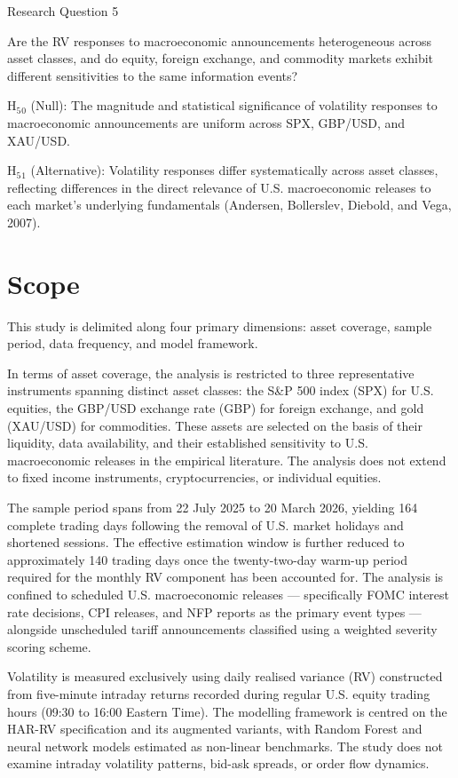 \documentclass[12pt,a4paper]{report}
\begin{document}
Research Question 5

Are the RV responses to macroeconomic announcements heterogeneous across asset classes, and do equity, foreign exchange, and commodity markets exhibit different sensitivities to the same information events?

H$_{5}$$_{0}$ (Null): The magnitude and statistical significance of volatility responses to macroeconomic announcements are uniform across SPX, GBP/USD, and XAU/USD.

H$_{5}$$_{1}$ (Alternative): Volatility responses differ systematically across asset classes, reflecting differences in the direct relevance of U.S. macroeconomic releases to each market's underlying fundamentals (Andersen, Bollerslev, Diebold, and Vega, 2007).

\section{Scope}
This study is delimited along four primary dimensions: asset coverage, sample period, data frequency, and model framework.

In terms of asset coverage, the analysis is restricted to three representative instruments spanning distinct asset classes: the S\&P 500 index (SPX) for U.S. equities, the GBP/USD exchange rate (GBP) for foreign exchange, and gold (XAU/USD) for commodities. These assets are selected on the basis of their liquidity, data availability, and their established sensitivity to U.S. macroeconomic releases in the empirical literature. The analysis does not extend to fixed income instruments, cryptocurrencies, or individual equities.

The sample period spans from 22 July 2025 to 20 March 2026, yielding 164 complete trading days following the removal of U.S. market holidays and shortened sessions. The effective estimation window is further reduced to approximately 140 trading days once the twenty-two-day warm-up period required for the monthly RV component has been accounted for. The analysis is confined to scheduled U.S. macroeconomic releases --- specifically FOMC interest rate decisions, CPI releases, and NFP reports as the primary event types --- alongside unscheduled tariff announcements classified using a weighted severity scoring scheme.

Volatility is measured exclusively using daily realised variance (RV) constructed from five-minute intraday returns recorded during regular U.S. equity trading hours (09:30 to 16:00 Eastern Time). The modelling framework is centred on the HAR-RV specification and its augmented variants, with Random Forest and neural network models estimated as non-linear benchmarks. The study does not examine intraday volatility patterns, bid-ask spreads, or order flow dynamics.
\end{document}
